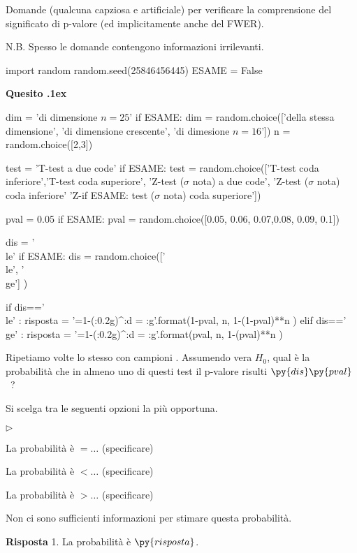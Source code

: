\documentclass[11pt,twoside,a4paper]{article}
\newcommand{\mylabel}[1]{#1\hfill}
\renewenvironment{itemize}
  {\begin{list}{$\triangleright$}{%
   \setlength{\parskip}{0mm}
   \setlength{\topsep}{.4\baselineskip}
   \setlength{\rightmargin}{0mm}
   \setlength{\listparindent}{0mm}
   \setlength{\itemindent}{0mm}
   \setlength{\labelwidth}{2ex}
   \setlength{\itemsep}{.4\baselineskip}
   \setlength{\parsep}{0mm}
   \setlength{\partopsep}{0mm}
   \setlength{\labelsep}{1ex}
   \setlength{\leftmargin}{\labelwidth+\labelsep}
   \let\makelabel\mylabel}}{%
   \end{list}\vspace*{-1.3mm}}
\newcounter{quesito}
\newenvironment{question}{\bigskip\addtocounter{quesito}{1}\par\textbf{Quesito \thequesito.\kern1ex}}{\vspace{\parskip}}
\newenvironment{answer}{\par\textbf{Risposta\quad}}{\vspace{\parskip}}
\begin{document}
\colorbox{blue!10}{\begin{minipage}{\textwidth}
Domande (qualcuna capziosa e artificiale) per verificare la comprensione del significato di p-valore (ed implicitamente anche del FWER).\bigskip

N.B. Spesso le domande contengono informazioni irrilevanti.
\end{minipage}}

\bigskip\bigskip

\begin{pycode}
import random
random.seed(25846456445)
ESAME = False
\end{pycode}

\begin{question} %
\begin{pycode}
dim = 'di dimensione $n = 25$'
if ESAME: dim  = random.choice(['della stessa dimensione', 'di dimensione crescente', 'di dimesione $n =16$'])
n = random.choice([2,3])

test = 'T-test a due code'
if ESAME: test = random.choice(['T-test coda inferiore','T-test coda superiore', 'Z-test ($\sigma$ nota) a due code', 'Z-test ($\sigma$ nota) coda inferiore' 'Z-if ESAME: test ($\sigma$ nota) coda superiore'])


pval = 0.05
if ESAME: pval = random.choice([0.05, 0.06, 0.07,0.08, 0.09, 0.1])

dis = '\\le'
if ESAME: dis = random.choice(['\\le', '\\ge'] )

if   dis=='\\le' : risposta = '=1-({:0.2g})^{:d} = {:g}'.format(1-pval, n, 1-(1-pval)**n )
elif dis=='\\ge' : risposta = '=1-({:0.2g})^{:d} = {:g}'.format(pval, n, 1-(pval)**n )
\end{pycode}
Ripetiamo  volte lo stesso  con campioni .
Assumendo vera $H_0$, qual è la probabilità che in almeno uno di questi test il p-valore risulti $\py{dis}\py{pval}$~? 

Si scelga tra le seguenti opzioni la più opportuna.
\begin{itemize}
\item[1.] La probabilità è $=\dots$ (specificare)
\item[2.] La probabilità è $<\dots$ (specificare)
\item[3.] La probabilità è $>\dots$ (specificare)
\item[4.] Non ci sono sufficienti informazioni per stimare questa probabilità.
\end{itemize}
\begin{answer}
{\color{blue}1. La probabilità è $\py{risposta}$.}
\end{answer}
\end{question}
\end{document}
